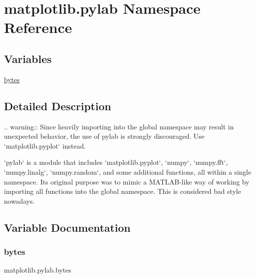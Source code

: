 \hypertarget{namespacematplotlib_1_1pylab}{}\section{matplotlib.\+pylab Namespace Reference}
\label{namespacematplotlib_1_1pylab}
\subsection*{Variables}
\begin{DoxyCompactItemize}
\item 
\hyperlink{namespacematplotlib_1_1pylab_ac3cd899c941cf10e7d5b9f66d25769ca}{bytes}
\end{DoxyCompactItemize}


\subsection{Detailed Description}
\begin{DoxyVerb}.. warning::
   Since heavily importing into the global namespace may result in unexpected
   behavior, the use of pylab is strongly discouraged. Use `matplotlib.pyplot`
   instead.

`pylab` is a module that includes `matplotlib.pyplot`, `numpy`, `numpy.fft`,
`numpy.linalg`, `numpy.random`, and some additional functions, all within
a single namespace. Its original purpose was to mimic a MATLAB-like way
of working by importing all functions into the global namespace. This is
considered bad style nowadays.
\end{DoxyVerb}
 

\subsection{Variable Documentation}
\mbox{\label{namespacematplotlib_1_1pylab_ac3cd899c941cf10e7d5b9f66d25769ca}} 
\subsubsection{\texorpdfstring{bytes}{bytes}}
{\footnotesize\ttfamily matplotlib.\+pylab.\+bytes}

